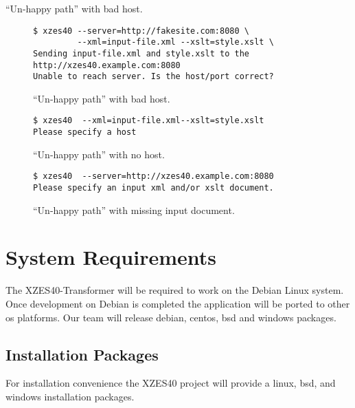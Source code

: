 \begin{enmerate}
\begin{itemzie}
``Un-happy path'' with bad host.
\begin{figure}
\begin{lstlisting}
$ xzes40 --server=http://fakesite.com:8080 \
         --xml=input-file.xml --xslt=style.xslt \
Sending input-file.xml and style.xslt to the http://xzes40.example.com:8080
Unable to reach server. Is the host/port correct?
\end{lstlisting}
\caption{``Un-happy path'' with bad host.}
\end{figure}

\begin{figure}
\begin{lstlisting}
$ xzes40  --xml=input-file.xml--xslt=style.xslt
Please specify a host
\end{lstlisting}
\caption{``Un-happy path'' with no host.}
\end{figure}

\begin{figure}
\begin{lstlisting}
$ xzes40  --server=http://xzes40.example.com:8080
Please specify an input xml and/or xslt document.
\end{lstlisting}
\caption{``Un-happy path'' with missing input document.}
\end{figure}

\section{System Requirements}
\label{system-requirements}

The XZES40-Transformer will be required to work on the Debian Linux system.
Once development on Debian is completed the application will be ported to other \gls{os} platforms.
Our team will release \gls{debian}, \gls{centos}, \gls{bsd} and \gls{windows} packages.
  
\subsection{Installation Packages}
\label{installation-packages}

For installation convenience the XZES40 project will provide a \gls{linux}, \gls{bsd}, and \gls{windows} installation packages.


\end{itemzie}
\end{enmerate}
